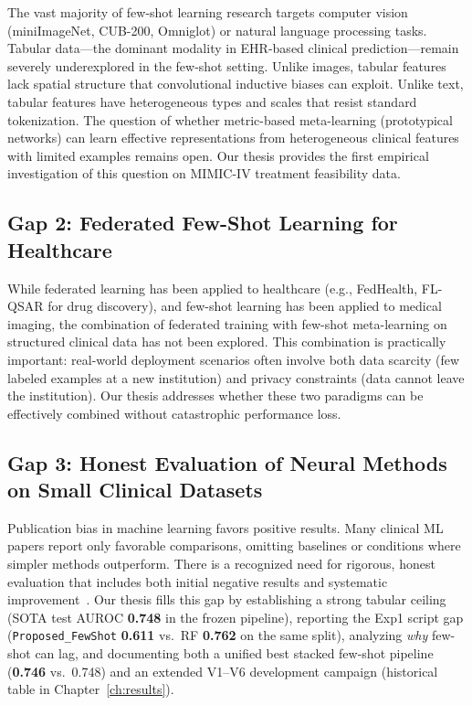 The vast majority of few-shot learning research targets computer vision (miniImageNet, CUB-200, Omniglot) or natural language processing tasks. Tabular data---the dominant modality in EHR-based clinical prediction---remain severely underexplored in the few-shot setting. Unlike images, tabular features lack spatial structure that convolutional inductive biases can exploit. Unlike text, tabular features have heterogeneous types and scales that resist standard tokenization. The question of whether metric-based meta-learning (prototypical networks) can learn effective representations from heterogeneous clinical features with limited examples remains open. Our thesis provides the first empirical investigation of this question on MIMIC-IV treatment feasibility data.

\subsection{Gap 2: Federated Few-Shot Learning for Healthcare}

While federated learning has been applied to healthcare (e.g., FedHealth, FL-QSAR for drug discovery), and few-shot learning has been applied to medical imaging, the combination of federated training with few-shot meta-learning on structured clinical data has not been explored. This combination is practically important: real-world deployment scenarios often involve both data scarcity (few labeled examples at a new institution) and privacy constraints (data cannot leave the institution). Our thesis addresses whether these two paradigms can be effectively combined without catastrophic performance loss.

\subsection{Gap 3: Honest Evaluation of Neural Methods on Small Clinical Datasets}

Publication bias in machine learning favors positive results. Many clinical ML papers report only favorable comparisons, omitting baselines or conditions where simpler methods outperform. There is a recognized need for rigorous, honest evaluation that includes both initial negative results and systematic improvement~\cite{makel2012replications}. Our thesis fills this gap by establishing a strong tabular ceiling (SOTA test AUROC \textbf{0.748} in the frozen pipeline), reporting the Exp1 script gap (\texttt{Proposed\_FewShot} \textbf{0.611} vs.\ RF \textbf{0.762} on the same split), analyzing \emph{why} few-shot can lag, and documenting both a unified best stacked few-shot pipeline (\textbf{0.746} vs.\ 0.748) and an extended V1--V6 development campaign (historical table in Chapter~\ref{ch:results}).

